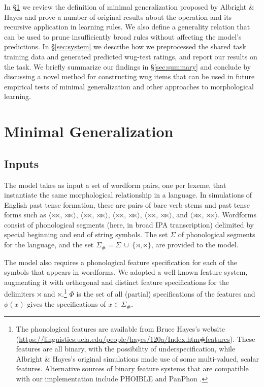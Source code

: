 \documentclass[11pt]{article}
\begin{document}
In \S\ref{sec:mingen} we review the definition of minimal generalization proposed by Albright \& Hayes and prove a number of original results about the operation and its recursive application in learning rules. We also define a generality relation that can be used to prune insufficiently broad rules without affecting the model's predictions. In \S\ref{sec:system} we describe how we preprocessed the shared task training data and generated predicted wug-test ratings, and report our results on the  task. We briefly summarize our findings in \S\ref{sec:summary} and conclude by discussing a novel method for constructing wug items that can be used in future empirical tests of minimal generalization and other approaches to morphological learning.

\section{Minimal Generalization}
\label{sec:mingen}

\subsection{Inputs}

The model takes as input a set of wordform pairs, one per lexeme, that instantiate the same morphological relationship in a language. In simulations of English past tense formation, these are pairs of bare verb stems and past tense forms such as $\langle$$\rtimes$$\ltimes$, $\rtimes$$\ltimes$$\rangle$, $\langle$$\rtimes$$\ltimes$, $\rtimes$$\ltimes$$\rangle$, $\langle$$\rtimes$$\ltimes$, $\rtimes$$\ltimes$$\rangle$, $\langle$$\rtimes$$\ltimes$, $\rtimes$$\ltimes$$\rangle$, and $\langle$$\rtimes$$\ltimes$, $\rtimes$$\ltimes$$\rangle$. Wordforms consist of phonological segments (here, in broad IPA transcription) delimited by special beginning and end of string symbols. The set $\Sigma$ of phonological segments for the language, and the set $\Sigma_{\#} = \Sigma \ \cup \ \{ \rtimes, \ltimes \}$, are provided to the model.

The model also requires a phonological feature specification for each of the symbols that appears in wordforms. We adopted a well-known feature system, augmenting it with orthogonal and distinct feature specifications for the delimiters $\rtimes$ and $\ltimes$.\footnote{The phonological features are available from Bruce Hayes's website (\url{https://linguistics.ucla.edu/people/hayes/120a/Index.htm\#features}). These features are all binary, with the possibility of underspecification, while Albright \& Hayes's original simulations made use of some multi-valued, scalar features. Alternative sources of binary feature systems that are compatible with our implementation include PHOIBLE \citep{moran2014} and PanPhon \citep{mortensen-etal-2016-panphon}.} $\Phi$ is the set of all (partial) specifications of the features and $\phi(x)$ gives the specifications of $x \in \Sigma_{\#}$.
\end{document}
